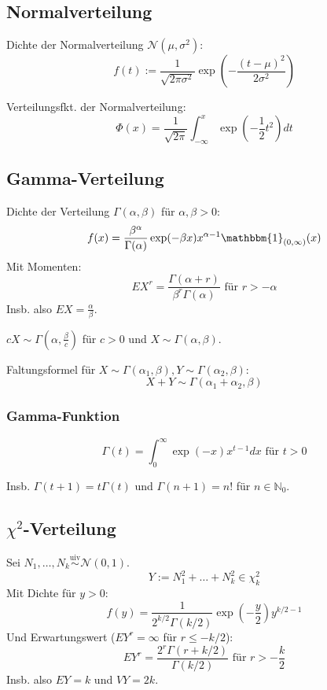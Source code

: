 \renewcommand{\N}{\mathcal{N}}
\newcommand{\1}{\mathbbm{1}}
\newcommand{\uiv}{\stackrel{\text{uiv}}{\sim}}

\subsection*{Normalverteilung}

Dichte der Normalverteilung \(\N(\mu, \sigma^2)\):
\[ f(t) := \frac{1}{\sqrt{2\pi\sigma^2}} \exp\left( -\frac{(t-\mu)^2}{2\sigma^2} \right) \]

Verteilungsfkt. der Normalverteilung:
\[ \Phi(x) = \frac{1}{\sqrt{2\pi}} \int_{-\infty}^x \exp\left(-\frac{1}{2} t^2\right) dt \]

\subsection*{Gamma-Verteilung}

Dichte der Verteilung \(\Gamma(\alpha,\beta)\) für \(\alpha,\beta > 0\):
\[ f(x) = \frac{\beta^\alpha}{\Gamma(\alpha)} \exp(-\beta x) x^{\alpha-1} \1_{(0,\infty)}(x) \]
Mit Momenten:
\[ EX^r = \frac{\Gamma(\alpha + r)}{\beta^r \Gamma(\alpha)} \text{ für } r > -\alpha \]
Insb. also \(EX = \frac{\alpha}{\beta}\).

\(cX \sim \Gamma(\alpha,\frac{\beta}{c})\) für \(c > 0\) und \(X \sim \Gamma(\alpha,\beta)\).

Faltungsformel für \(X \sim \Gamma(\alpha_1,\beta), Y \sim \Gamma(\alpha_2,\beta)\):
\[ X + Y \sim \Gamma(\alpha_1+\alpha_2, \beta) \]

\subsubsection*{Gamma-Funktion}

\[ \Gamma(t) = \int_0^\infty \exp(-x) x^{t-1} dx \text{ für } t > 0 \]

Insb. \(\Gamma(t+1) = t\Gamma(t)\) und \(\Gamma(n+1) = n!\) für \(n \in \mathbb{N}_0\).

\subsection*{\(\chi^2\)-Verteilung}

Sei \(N_1,\dots,N_k \uiv \N(0,1)\).
\[ Y:=N_1^2+\dots+N_k^2 \in \chi_k^2 \]
Mit Dichte für \(y > 0\):
\[ f(y) = \frac{1}{2^{k/2} \Gamma(k/2)} \exp\left(-\frac{y}{2}\right) y^{k/2-1} \]
Und Erwartungswert (\(EY^r = \infty\) für \(r\leq -k/2\)):
\[ EY^r = \frac{2^r \Gamma(r+k/2)}{\Gamma(k/2)} \text{ für } r > -\frac{k}{2} \]
Insb. also \(EY = k\) und \(VY = 2k\).

